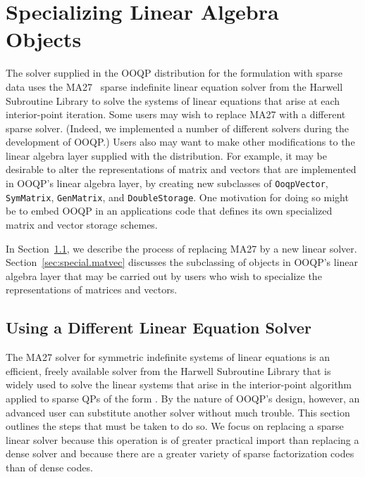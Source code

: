 \section{Specializing Linear Algebra Objects}
\label{sec.specializing-linalg}

The solver supplied in the OOQP distribution for the formulation
 with sparse data uses the MA27~\cite{duff82ma27} sparse
indefinite linear equation solver from the Harwell Subroutine Library
to solve the systems of linear equations that arise at each
interior-point iteration. Some users may wish to replace MA27 with a
different sparse solver. (Indeed, we implemented a number of
different solvers during the development of OOQP.) Users also may want
to make other modifications to the linear algebra layer supplied with
the distribution. For example, it may be desirable to alter the
representations of matrix and vectors that are implemented in OOQP's
linear algebra layer, by creating new subclasses of
\texttt{OoqpVector}, \texttt{SymMatrix}, \texttt{GenMatrix}, and
\texttt{DoubleStorage}. One motivation for doing so might
be to embed OOQP in an applications code that defines its own
specialized matrix and vector storage schemes.

In Section~\ref{sec:new.linear.solver}, we describe the process of
replacing MA27 by a new linear solver.
Section~\ref{sec:special.matvec} discusses the subclassing of objects
in OOQP's linear algebra layer that may be carried out by users who
wish to specialize the representations of matrices and vectors.

\subsection{Using a Different Linear Equation Solver}
\label{sec:new.linear.solver}

The MA27 solver for symmetric indefinite systems of linear equations
is an efficient, freely available solver from the Harwell Subroutine
Library that is widely used to solve the linear systems that arise in
the interior-point algorithm applied to sparse QPs of the form
. By the nature of OOQP's design, however, an advanced
user can substitute another solver without much trouble. This section
outlines the steps that must be taken to do so.  We focus on replacing
a sparse linear solver because this operation is of greater practical
import than replacing a dense solver and because there are a
greater variety of sparse factorization codes than of dense codes.

